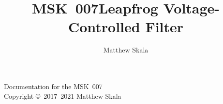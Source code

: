 \documentclass{ncmanual}
\title{MSK~007\quad Leapfrog Voltage-Controlled Filter}
\author{Matthew Skala}
\begin{document}
\maketitle


\begin{copyrightpage}
Documentation for the MSK~007\\
Copyright \copyright\ 2017--2021 Matthew Skala

\GPLThreeStatement
\end{copyrightpage}

\tableofcontents















\end{document}
